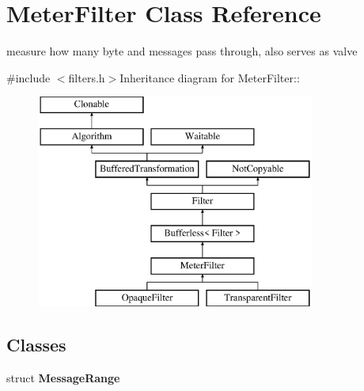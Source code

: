 \hypertarget{class_meter_filter}{
\section{MeterFilter Class Reference}
\label{class_meter_filter}
}


measure how many byte and messages pass through, also serves as valve  


{\ttfamily \#include $<$filters.h$>$}Inheritance diagram for MeterFilter::\begin{figure}[H]
\begin{center}
\leavevmode
\includegraphics[height=7cm]{class_meter_filter}
\end{center}
\end{figure}
\subsection*{Classes}
\begin{DoxyCompactItemize}
\item 
struct {\bfseries MessageRange}
\end{DoxyCompactItemize}
